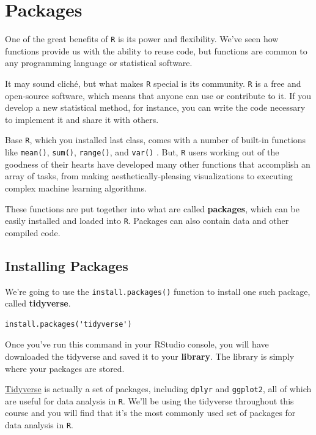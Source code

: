 \documentclass[
  letterpaper,
]{book}
\begin{document}
\hypertarget{packages}{%
\section{Packages}\label{packages}}

One of the great benefits of \texttt{R} is its power and flexibility.
We've seen how functions provide us with the ability to reuse code, but
functions are common to any programming language or statistical
software.

It may sound cliché, but what makes \texttt{R} special is its community.
\texttt{R} is a free and open-source software, which means that anyone
can use or contribute to it. If you develop a new statistical method,
for instance, you can write the code necessary to implement it and share
it with others.

Base \texttt{R}, which you installed last class, comes with a number of
built-in functions like \texttt{mean()}, \texttt{sum()},
\texttt{range()}, and \texttt{var()} . But, \texttt{R} users working out
of the goodness of their hearts have developed many other functions that
accomplish an array of tasks, from making aesthetically-pleasing
visualizations to executing complex machine learning algorithms.

These functions are put together into what are called \textbf{packages},
which can be easily installed and loaded into \texttt{R}. Packages can
also contain data and other compiled code.

\hypertarget{installing-packages}{%
\subsection{Installing Packages}\label{installing-packages}}

We're going to use the \texttt{install.packages()} function to install
one such package, called \textbf{tidyverse}.

\begin{verbatim}
install.packages('tidyverse')
\end{verbatim}

Once you've run this command in your RStudio console, you will have
downloaded the tidyverse and saved it to your \textbf{library}. The
library is simply where your packages are stored.

\href{https://tidyverse.tidyverse.org/}{Tidyverse} is actually a set of
packages, including \texttt{dplyr} and \texttt{ggplot2}, all of which
are useful for data analysis in \texttt{R}. We'll be using the tidyverse
throughout this course and you will find that it's the most commonly
used set of packages for data analysis in \texttt{R}.
\end{document}
